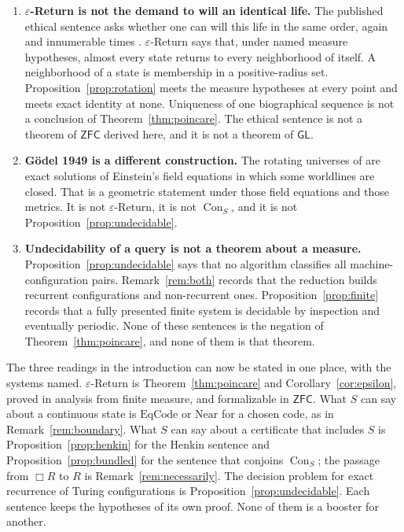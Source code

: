 \documentclass[11pt]{article}
\DeclareMathOperator{\Con}{Con}
\newcommand{\ZFC}{\mathsf{ZFC}}
\newcommand{\GL}{\mathsf{GL}}
\theoremstyle{definition}
\theoremstyle{remark}
\begin{document}
\begin{enumerate}
\item \textbf{\(\varepsilon\)-Return is not the demand to will an identical life.}
The published ethical sentence asks whether one can will this life in the same order, again and innumerable times \citep[\S 341]{nietzsche1882}.
\(\varepsilon\)-Return says that, under named measure hypotheses, almost every state returns to every neighborhood of itself.
A neighborhood of a state is membership in a positive-radius set.
Proposition~\ref{prop:rotation} meets the measure hypotheses at every point and meets exact identity at none.
Uniqueness of one biographical sequence is not a conclusion of Theorem~\ref{thm:poincare}.
The ethical sentence is not a theorem of \(\ZFC\) derived here, and it is not a theorem of \(\GL\).

\item \textbf{G\"odel 1949 is a different construction.}
The rotating universes of \citet{godel1949} are exact solutions of Einstein's field equations in which some worldlines are closed.
That is a geometric statement under those field equations and those metrics.
It is not \(\varepsilon\)-Return, it is not \(\Con_{S}\), and it is not Proposition~\ref{prop:undecidable}.

\item \textbf{Undecidability of a query is not a theorem about a measure.}
Proposition~\ref{prop:undecidable} says that no algorithm classifies all machine-configuration pairs.
Remark~\ref{rem:both} records that the reduction builds recurrent configurations and non-recurrent ones.
Proposition~\ref{prop:finite} records that a fully presented finite system is decidable by inspection and eventually periodic.
None of these sentences is the negation of Theorem~\ref{thm:poincare}, and none of them is that theorem.
\end{enumerate}

The three readings in the introduction can now be stated in one place, with the systems named.
\(\varepsilon\)-Return is Theorem~\ref{thm:poincare} and Corollary~\ref{cor:epsilon}, proved in analysis from finite measure, and formalizable in \(\ZFC\).
What \(S\) can say about a continuous state is \(\mathrm{EqCode}\) or \(\mathrm{Near}\) for a chosen code, as in Remark~\ref{rem:boundary}.
What \(S\) can say about a certificate that includes \(S\) is Proposition~\ref{prop:henkin} for the Henkin sentence and Proposition~\ref{prop:bundled} for the sentence that conjoins \(\Con_{S}\); the passage from \(\Box R\) to \(R\) is Remark~\ref{rem:necessarily}.
The decision problem for exact recurrence of Turing configurations is Proposition~\ref{prop:undecidable}.
Each sentence keeps the hypotheses of its own proof.
None of them is a booster for another.



\end{document}
